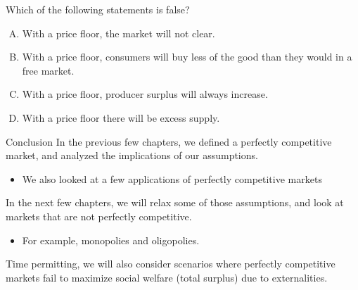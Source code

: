 \documentclass[11pt,t]{beamer}
\begin{document}
\begin{frame}{}
  Which of the following statements is false?

  \bigskip
  \begin{enumerate}[A)]
    \item With a price floor, the market will not clear.
    \item With a price floor, consumers will buy less of the good than they would in a free market.
    \item With a price floor, producer surplus will always increase.
    \item With a price floor there will be excess supply.
  \end{enumerate}
\end{frame}

\begin{frame}{Conclusion}
  In the previous few chapters, we defined a perfectly competitive market, and analyzed the implications of our assumptions.

  \begin{itemize}
    \item We also looked at a few applications of perfectly competitive markets
  \end{itemize}

  \medskip
  In the next few chapters, we will relax some of those assumptions, and look at markets that are not perfectly competitive.

  \begin{itemize}
    \item For example, monopolies and oligopolies.
  \end{itemize}
  
  \medskip
  Time permitting, we will also consider scenarios where perfectly competitive markets fail to maximize social welfare (total surplus) due to externalities.
\end{frame}
\end{document}
